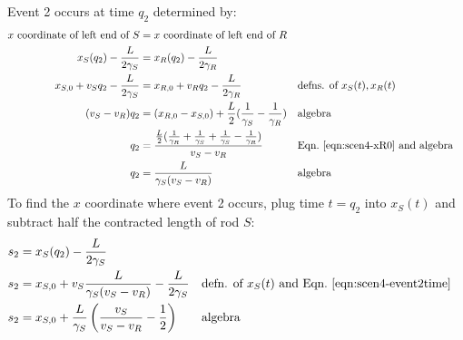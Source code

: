 \documentclass[a4paper]{article}
\theoremstyle{plain}
\theoremstyle{definition}
\begin{document}
Event 2 occurs at time $q_2$ determined by:
\begin{align}
\text{$x$ coordinate of left end of $S$} & = \text{$x$ coordinate of left end of $R$} \nonumber \\
x_S(q_2) - \frac{L}{2\gamma_S} & = x_R(q_2) - \frac{L}{2\gamma_R} \nonumber \\
x_{S,0} + v_S q_2 - \frac{L}{2\gamma_S} & = x_{R,0} + v_R q_2 - \frac{L}{2\gamma_R} & & \text{defns. of $x_S(t), x_R(t)$} \nonumber \\
(v_S - v_R) q_2 & = (x_{R,0} - x_{S,0}) + \frac{L}{2} ( \frac{1}{\gamma_S} - \frac{1}{\gamma_R} ) & & \text{algebra} \nonumber \\
q_2 & = \frac{ \frac{L}{2} ( \frac{1}{\gamma_R} + \frac{1}{\gamma_S} + \frac{1}{\gamma_S} - \frac{1}{\gamma_R})}{v_S - v_R} & & \text{Eqn.~\eqref{eqn:scen4-xR0} and algebra} \nonumber \\
q_2 & = \frac{L}{\gamma_S(v_S - v_R)} & & \text{algebra} \label{eqn:scen4-event2time}
\end{align}
To find the $x$ coordinate where event 2 occurs, plug time $t=q_2$
into $x_S(t)$ and subtract half the contracted length of rod $S$:
\begin{align}
s_2 & = x_S(q_2) - \frac{L}{2\gamma_S} \nonumber \\
s_2 & = x_{S,0} + v_S \frac{L}{\gamma_S(v_S - v_R)} - \frac{L}{2\gamma_S} & & \text{defn. of $x_S(t)$ and Eqn.~\eqref{eqn:scen4-event2time}} \nonumber \\
s_2 & = x_{S,0} + \frac{L}{\gamma_S} \left( \frac{v_S}{v_S - v_R} - \frac{1}{2} \right) & & \text{algebra} \label{eqn:scen4-event2xcoord}
\end{align}
\end{document}
